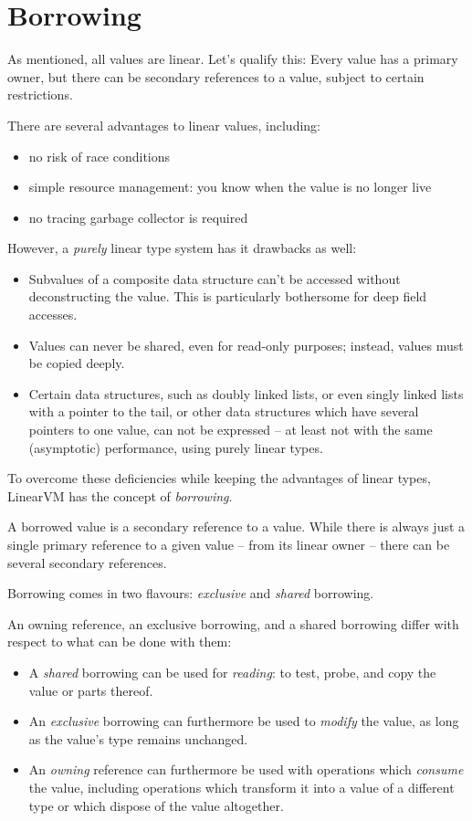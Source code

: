 \documentclass[a4paper]{book}
\begin{document}
\section{Borrowing}
\label{sec:design-borrowing}
As mentioned, all values are linear.  Let's qualify this: Every value
has a primary owner, but there can be secondary references to a value,
subject to certain restrictions.

There are several advantages to linear values, including:
\begin{itemize}
\item no risk of race conditions
\item simple resource management: you know when the value is no longer live
\item no tracing garbage collector is required
\end{itemize}

\noindent
However, a \emph{purely} linear type system has it drawbacks as well:
\begin{itemize}
\item Subvalues of a composite data structure can't be accessed
  without deconstructing the value. This is particularly bothersome
  for deep field accesses.

\item Values can never be shared, even for read-only purposes; instead,
  values must be copied deeply.

\item Certain data structures, such as doubly linked lists, or even
  singly linked lists with a pointer to the tail, or other data
  structures which have several pointers to one value, can not be
  expressed -- at least not with the same (asymptotic) performance,
  using purely linear types.
\end{itemize}

To overcome these deficiencies while keeping the advantages of linear types,
LinearVM has the concept of \emph{borrowing}.

A borrowed value is a secondary reference to a value.
While there is always just a single primary reference to a given value
-- from its linear owner -- there can be several secondary references.

Borrowing comes in two flavours: \emph{exclusive} and \emph{shared} borrowing.

An owning reference, an exclusive borrowing, and a shared borrowing differ
with respect to what can be done with them:
\begin{itemize}
\item A \emph{shared} borrowing can be used for \emph{reading}: to test,
  probe, and copy the value or parts thereof.
\item An \emph{exclusive} borrowing can furthermore be used to \emph{modify} the value,
  as long as the value's type remains unchanged.

\item An \emph{owning} reference can furthermore be used with
  operations which \emph{consume} the value, including operations
  which transform it into a value of a different type or which dispose
  of the value altogether.
\end{itemize}
\end{document}
